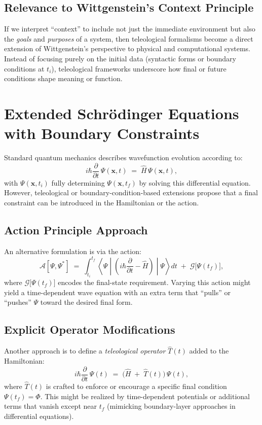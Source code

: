 \documentclass[11pt]{article}
\begin{document}
\subsection{Relevance to Wittgenstein’s Context Principle}
If we interpret “context” to include not just the immediate environment but also the \emph{goals} and \emph{purposes} of a system, then teleological formalisms become a direct extension of Wittgenstein’s perspective to physical and computational systems. Instead of focusing purely on the initial data (syntactic forms or boundary conditions at $t_i$), teleological frameworks underscore how final or future conditions shape meaning or function.

\section{Extended Schr\"odinger Equations with Boundary Constraints}
\label{sec:extendedSE}
Standard quantum mechanics describes wavefunction evolution according to:
\begin{equation}
    i \hbar \frac{\partial}{\partial t}\,\Psi(\mathbf{x},t) \;=\; \hat{H}\,\Psi(\mathbf{x},t),
    \label{eq:SchrodingerStandard}
\end{equation}
with $\Psi(\mathbf{x},t_i)$ fully determining $\Psi(\mathbf{x},t_f)$ by solving this differential equation. However, teleological or boundary-condition-based extensions propose that a final constraint can be introduced in the Hamiltonian or the action.

\subsection{Action Principle Approach}
An alternative formulation is via the action:
\begin{equation}
    \mathcal{A}[\Psi,\Psi^*] \;=\; \int_{t_i}^{t_f} \left\langle \Psi \middle\vert 
    \left(i\hbar \frac{\partial}{\partial t} - \hat{H} \right)
    \middle\vert \Psi \right\rangle dt \;+\; \mathcal{G}\bigl[\Psi(t_f)\bigr],
\end{equation}
where $\mathcal{G}\bigl[\Psi(t_f)\bigr]$ encodes the final-state requirement. Varying this action might yield a time-dependent wave equation with an extra term that ``pulls'' or ``pushes'' $\Psi$ toward the desired final form.

\subsection{Explicit Operator Modifications}
Another approach is to define a \emph{teleological operator} $\hat{T}(t)$ added to the Hamiltonian:
\begin{equation}
    i \hbar \frac{\partial}{\partial t}\,\Psi(t) 
    \;=\; \bigl(\hat{H} \;+\; \hat{T}(t)\bigr)\,\Psi(t),
\end{equation}
where $\hat{T}(t)$ is crafted to enforce or encourage a specific final condition $\Psi(t_f) = \Phi$. This might be realized by time-dependent potentials or additional terms that vanish except near $t_f$ (mimicking boundary-layer approaches in differential equations).
\end{document}
